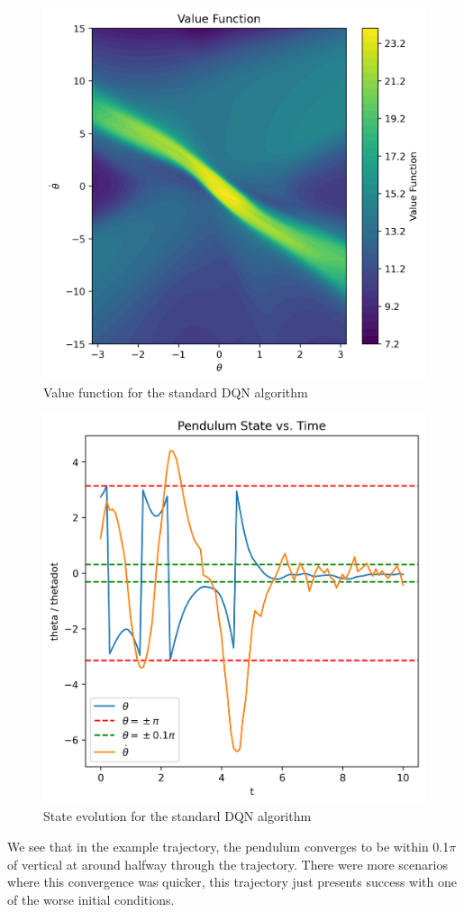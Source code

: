 \documentclass[conference]{IEEEtran}
\begin{document}
\begin{figure}[h]
\centering
\includegraphics[width=\linewidth]{../figures/yes_target_yes_replay/ctr_value_func_150_1000.png}
\caption{Value function for the standard DQN algorithm}
\label{fig:yes_target_yes_replay_value_function}
\end{figure}
\begin{figure}[h]
\centering
\includegraphics[width=\linewidth]{../figures/yes_target_yes_replay/state_150_1000.png}
\caption{State evolution for the standard DQN algorithm}
\label{fig:yes_target_yes_replay_state_evolution}
\end{figure}
We see that in the example trajectory, the pendulum converges to be within 0.1$\pi$ of vertical at around halfway through the trajectory. There were more scenarios where this convergence was quicker, this trajectory just presents success with one of the worse initial conditions.
\end{document}

